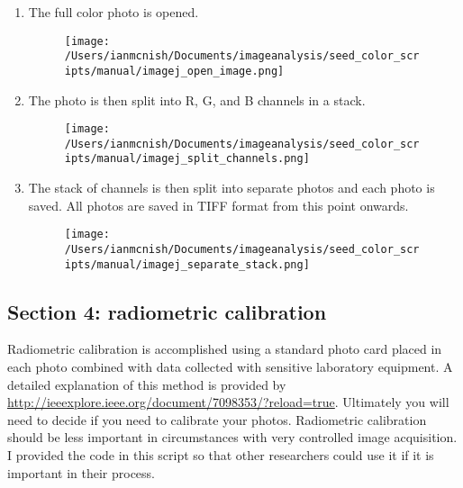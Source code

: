 \documentclass[12pt]{article}
\begin{document}
\begin{enumerate}

\item The full color photo is opened.\\

\begin{figure}[H]
	\centering
	\texttt{[image: /Users/ianmcnish/Documents/imageanalysis/seed\_color\_scripts/manual/imagej\_open\_image.png]}
	\label{fig:imagej_open_image}
\end{figure}

\item The photo is then split into R, G, and B channels in a stack.\\

\begin{figure}[H]
	\centering
	\texttt{[image: /Users/ianmcnish/Documents/imageanalysis/seed\_color\_scripts/manual/imagej\_split\_channels.png]}
	\label{fig:imagej_split_channels}
\end{figure}

\item The stack of channels is then split into separate photos and each photo is saved. All photos are saved in TIFF format from this point onwards.\\

\begin{figure}[H]
	\centering
	\texttt{[image: /Users/ianmcnish/Documents/imageanalysis/seed\_color\_scripts/manual/imagej\_separate\_stack.png]}
	\label{fig:imagej_separate_stack}
\end{figure}

\end{enumerate}

\subsection{Section 4: radiometric calibration}\label{sec:imagej_radiometrics_calibration}

\noindent Radiometric calibration is accomplished using a standard photo card placed in each photo combined with data collected with sensitive laboratory equipment. A detailed explanation of this method is provided by \url{http://ieeexplore.ieee.org/document/7098353/?reload=true}. Ultimately you will need to decide if you need to calibrate your photos. Radiometric calibration should be less important in circumstances with very controlled image acquisition. I provided the code in this script so that other researchers could use it if it is important in their process.\\
\end{document}
